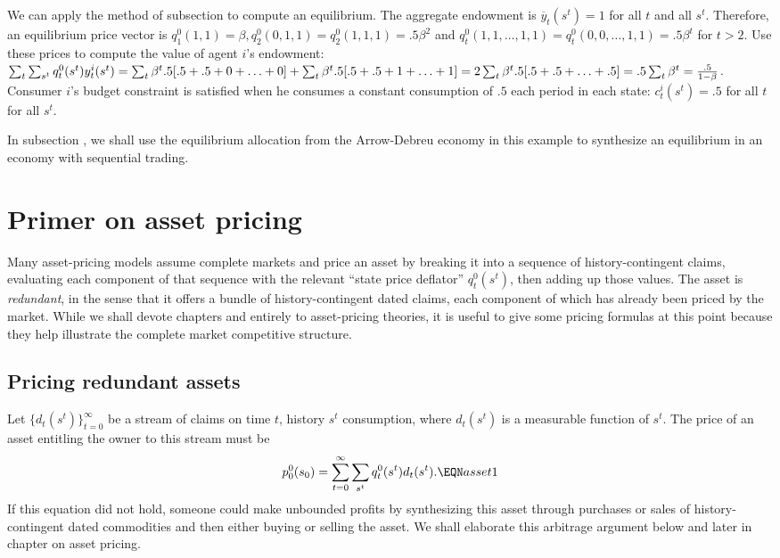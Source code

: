 We can apply the method of subsection  to compute an equilibrium.  The aggregate endowment is $\overline y_t(s^t)=1$
for all $t$ and all $s^t$.  Therefore, an equilibrium price vector is
$q_1^0(1,1) = \beta, q^0_2(0,1,1)= q^0_2(1,1,1)= .5 \beta^2$ and $q_t^0(1, 1, \ldots, 1, 1) = q_t^0(0, 0, \ldots, 1, 1) = .5 \beta^t$
for $t > 2$.  Use these prices to compute the value of agent $i$'s endowment: $\sum_t \sum_{s^t} q_t^0(s^t) y_t^i(s^t)
=\sum_t \beta^t .5 [.5 + .5 + 0 + \ldots + 0] +  \sum_t \beta^t .5 [.5 + .5 + 1 + \ldots +1] = 2 \sum_t \beta^t .5 [.5 + .5 + \ldots + .5] = .5 \sum_t \beta^t = {.5 \over 1 - \beta}$. %
  Consumer $i$'s budget constraint is satisfied when he consumes a constant
consumption of $.5$ each period in each state: $c_t^i(s^t) = .5$ for all $t$ for all $s^t$.

In subsection , we shall use the equilibrium allocation from the Arrow-Debreu economy in this example
to synthesize an equilibrium in an economy with sequential trading.





\section{Primer on asset pricing}
Many asset-pricing models       assume complete markets and price
an asset by breaking it into a sequence of history-contingent
claims, evaluating each  component of that sequence with the
relevant ``state price deflator'' $q_t^0(s^t)$, then adding up
those values. The  asset is  {\it redundant\/}, in the
sense that it offers a bundle of history-contingent dated claims,
each component of which has already  been priced by the market.
While we shall devote chapters  and  entirely  to
asset-pricing theories, it is useful to give some pricing formulas
at this  point because they help illustrate  the complete market
competitive structure.


\subsection{Pricing redundant assets}
  Let $\{d_t(s^t)\}_{t=0}^\infty$ be a stream of claims
on time $t$, history $s^t$ consumption, where $d_t(s^t)$ is a measurable
function of $s^t$.  The price of   an asset entitling
the owner to this stream
must be
$$ p^0_0(s_0)  = \sum_{t=0}^\infty  \sum_{s^t} q_t^0(s^t) d_t(s^t) . \EQN asset1
$$
If this equation did not hold, someone could make unbounded profits
by synthesizing this asset  through
purchases or sales  of  history-contingent dated commodities
and then either buying or selling the asset.
We shall elaborate  this arbitrage argument
below and later in  chapter  on asset pricing.




